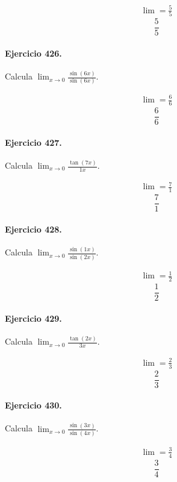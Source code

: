 \documentclass[11pt,a4paper]{article}
\begin{document}
\[
\begin{aligned}
\lim=\frac{5}{5}
\end{aligned}
\]
\[\boxed{\frac{5}{5}}\]


\paragraph{Ejercicio 426.} Calcula $\displaystyle\lim_{x\to0}\frac{\sin(6x)}{\sin(6x)}$.

\[
\begin{aligned}
\lim=\frac{6}{6}
\end{aligned}
\]
\[\boxed{\frac{6}{6}}\]


\paragraph{Ejercicio 427.} Calcula $\displaystyle\lim_{x\to0}\frac{\tan(7x)}{1x}$.

\[
\begin{aligned}
\lim=\frac{7}{1}
\end{aligned}
\]
\[\boxed{\frac{7}{1}}\]


\paragraph{Ejercicio 428.} Calcula $\displaystyle\lim_{x\to0}\frac{\sin(1x)}{\sin(2x)}$.

\[
\begin{aligned}
\lim=\frac{1}{2}
\end{aligned}
\]
\[\boxed{\frac{1}{2}}\]


\paragraph{Ejercicio 429.} Calcula $\displaystyle\lim_{x\to0}\frac{\tan(2x)}{3x}$.

\[
\begin{aligned}
\lim=\frac{2}{3}
\end{aligned}
\]
\[\boxed{\frac{2}{3}}\]


\paragraph{Ejercicio 430.} Calcula $\displaystyle\lim_{x\to0}\frac{\sin(3x)}{\sin(4x)}$.

\[
\begin{aligned}
\lim=\frac{3}{4}
\end{aligned}
\]
\[\boxed{\frac{3}{4}}\]
\end{document}

